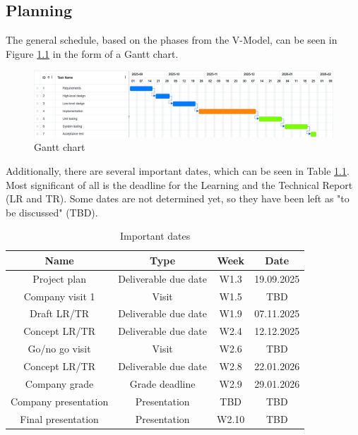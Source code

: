 \documentclass{report}
\begin{document}
	\begin{landscape}
		\chapter{Planning}\label{plan}
			The general schedule, based on the phases from the V-Model, can be seen in Figure \ref{fig:gantt} in the form of a Gantt chart.
		\begin{figure}[ht]
			\centering
			\includegraphics[width=1\linewidth]{img/gantt}
			\caption{Gantt chart}
			\label{fig:gantt}
		\end{figure}
		
		Additionally, there are several important dates, which can be seen in Table \ref{tab:dates}. Most significant of all is the deadline for the Learning and the Technical Report (LR and TR). Some dates are not determined yet, so they have been left as "to be discussed" (TBD). 
	
	\end{landscape}
		\begin{table}[ht]
			\centering
		\begin{tabular}{|c|c|c|c|}
			\hline
			Name & Type & Week & Date \\
			\hline
			Project plan & Deliverable due date & W1.3 & 19.09.2025 \\
			\hline
			Company visit 1 & Visit & W1.5 & TBD \\
			\hline
			Draft LR/TR & Deliverable due date & W1.9 & 07.11.2025 \\
			\hline
			Concept LR/TR & Deliverable due date & W2.4 & 12.12.2025 \\
			\hline
			Go/no go visit & Visit & W2.6 & TBD \\
			\hline
			Concept LR/TR & Deliverable due date & W2.8 & 22.01.2026 \\
			\hline
			Company grade & Grade deadline & W2.9 & 29.01.2026 \\
			\hline
			Company presentation & Presentation & TBD & TBD \\
			\hline
			Final presentation & Presentation & W2.10 & TBD \\
			\hline
		\end{tabular}
		\caption{Important dates}
		\label{tab:dates}
	\end{table}
		
\end{document}

